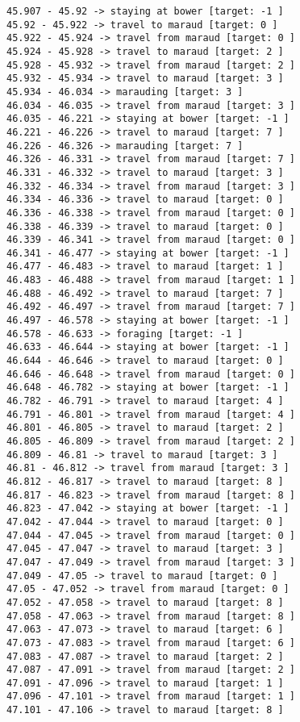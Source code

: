 \documentclass[11pt]{article}
\begin{document}
\begin{Verbatim}[commandchars=\\\{\}]
45.907 - 45.92 -> staying at bower [target: -1 ]
45.92 - 45.922 -> travel to maraud [target: 0 ]
45.922 - 45.924 -> travel from maraud [target: 0 ]
45.924 - 45.928 -> travel to maraud [target: 2 ]
45.928 - 45.932 -> travel from maraud [target: 2 ]
45.932 - 45.934 -> travel to maraud [target: 3 ]
45.934 - 46.034 -> marauding [target: 3 ]
46.034 - 46.035 -> travel from maraud [target: 3 ]
46.035 - 46.221 -> staying at bower [target: -1 ]
46.221 - 46.226 -> travel to maraud [target: 7 ]
46.226 - 46.326 -> marauding [target: 7 ]
46.326 - 46.331 -> travel from maraud [target: 7 ]
46.331 - 46.332 -> travel to maraud [target: 3 ]
46.332 - 46.334 -> travel from maraud [target: 3 ]
46.334 - 46.336 -> travel to maraud [target: 0 ]
46.336 - 46.338 -> travel from maraud [target: 0 ]
46.338 - 46.339 -> travel to maraud [target: 0 ]
46.339 - 46.341 -> travel from maraud [target: 0 ]
46.341 - 46.477 -> staying at bower [target: -1 ]
46.477 - 46.483 -> travel to maraud [target: 1 ]
46.483 - 46.488 -> travel from maraud [target: 1 ]
46.488 - 46.492 -> travel to maraud [target: 7 ]
46.492 - 46.497 -> travel from maraud [target: 7 ]
46.497 - 46.578 -> staying at bower [target: -1 ]
46.578 - 46.633 -> foraging [target: -1 ]
46.633 - 46.644 -> staying at bower [target: -1 ]
46.644 - 46.646 -> travel to maraud [target: 0 ]
46.646 - 46.648 -> travel from maraud [target: 0 ]
46.648 - 46.782 -> staying at bower [target: -1 ]
46.782 - 46.791 -> travel to maraud [target: 4 ]
46.791 - 46.801 -> travel from maraud [target: 4 ]
46.801 - 46.805 -> travel to maraud [target: 2 ]
46.805 - 46.809 -> travel from maraud [target: 2 ]
46.809 - 46.81 -> travel to maraud [target: 3 ]
46.81 - 46.812 -> travel from maraud [target: 3 ]
46.812 - 46.817 -> travel to maraud [target: 8 ]
46.817 - 46.823 -> travel from maraud [target: 8 ]
46.823 - 47.042 -> staying at bower [target: -1 ]
47.042 - 47.044 -> travel to maraud [target: 0 ]
47.044 - 47.045 -> travel from maraud [target: 0 ]
47.045 - 47.047 -> travel to maraud [target: 3 ]
47.047 - 47.049 -> travel from maraud [target: 3 ]
47.049 - 47.05 -> travel to maraud [target: 0 ]
47.05 - 47.052 -> travel from maraud [target: 0 ]
47.052 - 47.058 -> travel to maraud [target: 8 ]
47.058 - 47.063 -> travel from maraud [target: 8 ]
47.063 - 47.073 -> travel to maraud [target: 6 ]
47.073 - 47.083 -> travel from maraud [target: 6 ]
47.083 - 47.087 -> travel to maraud [target: 2 ]
47.087 - 47.091 -> travel from maraud [target: 2 ]
47.091 - 47.096 -> travel to maraud [target: 1 ]
47.096 - 47.101 -> travel from maraud [target: 1 ]
47.101 - 47.106 -> travel to maraud [target: 8 ]

\end{Verbatim}
\end{document}
